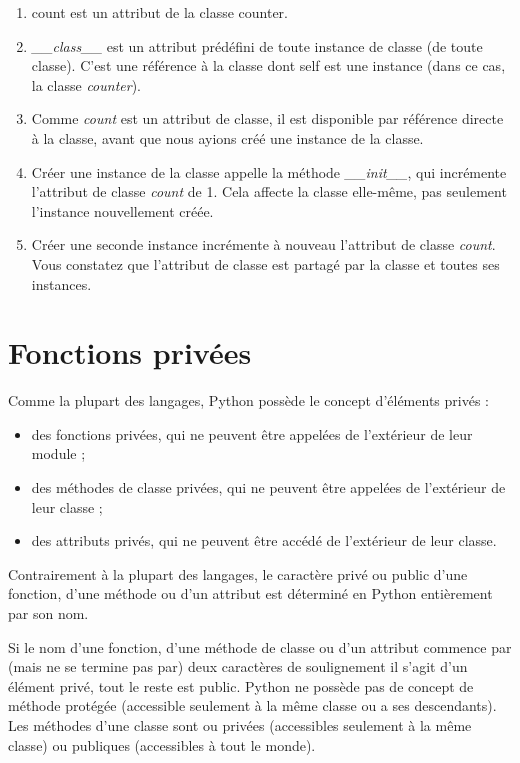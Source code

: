 \begin{enumerate}
    \item count est un attribut de la classe counter.
    \item  \emph{\_\_class\_\_} est un attribut prédéfini de toute instance de classe (de toute classe). C'est une référence à la classe dont self est une instance (dans ce cas, la classe \emph{counter}).
    \item  Comme \emph{count} est un attribut de classe, il est disponible par référence directe à la classe, avant que nous ayions créé une instance de la classe.
    \item  Créer une instance de la classe appelle la méthode \emph{\_\_init\_\_}, qui incrémente l'attribut de classe \emph{count} de 1. Cela affecte la classe elle-même, pas seulement l'instance nouvellement créée.
    \item  Créer une seconde instance incrémente à nouveau l'attribut de classe \emph{count}. Vous constatez que l'attribut de classe est partagé par la classe et toutes ses instances.
\end{enumerate}

\section{Fonctions privées}

Comme la plupart des langages, Python possède le concept d'éléments privés :
\begin{itemize}
  \item des fonctions privées, qui ne peuvent être appelées de l'extérieur de leur module ;
  \item des méthodes de classe privées, qui ne peuvent être appelées de l'extérieur de leur classe ;
  \item des attributs privés, qui ne peuvent être accédé de l'extérieur de leur classe.
\end{itemize}

Contrairement à la plupart des langages, le caractère privé ou public d'une fonction, d'une méthode ou d'un attribut est déterminé en Python entièrement par son nom.

Si le nom d'une fonction, d'une méthode de classe ou d'un attribut commence par (mais ne se termine pas par) deux caractères de soulignement il s'agit d'un élément privé, tout le reste est public. Python ne possède pas de concept de méthode protégée (accessible seulement à la même classe ou a ses descendants). Les  méthodes d'une classe sont ou privées (accessibles seulement à la même classe) ou publiques (accessibles à tout le monde).

